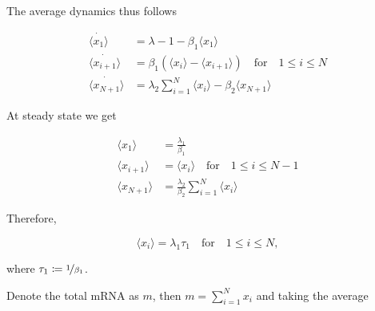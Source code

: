 The average dynamics thus follows

\begin{equation}
  \begin{split}
    \dot{\langle x_1\rangle} &= \lambda-1 -\beta_1\langle x_1\rangle\\
    \dot{\langle x_{i+1}\rangle} &= \beta_1\left(\langle x_i\rangle - \langle x_{i+1}\rangle\right)\quad\text{for}\quad 1\leq i\leq N\\
    \dot{\langle x_{N+1}\rangle} &= \lambda_2\sum_{i=1}^N\langle x_i\rangle-\beta_2\langle x_{N+1}\rangle
  \end{split}
\end{equation}

At steady state we get

\begin{equation}
  \begin{split}
    \langle x_1\rangle &= \frac{\lambda_1}{\beta_1}\\
    \langle x_{i+1}\rangle &= \langle x_i\rangle\quad\text{for}\quad 1\leq i\leq N-1\\
    \langle x_{N+1}\rangle &= \frac{\lambda_2}{\beta_2}\sum_{i=1}^N\langle x_i\rangle
  \end{split}
\end{equation}

Therefore,

\begin{equation}
  \langle x_i\rangle = \lambda_1\tau_1\quad\text{for}\quad 1\leq i\leq N,
\end{equation}

where $\tau_1 \coloneqq \nicefrac{1}{\beta_1}$.

Denote the total mRNA as $m$, then $m=\sum_{i=1}^Nx_i$ and taking the average
